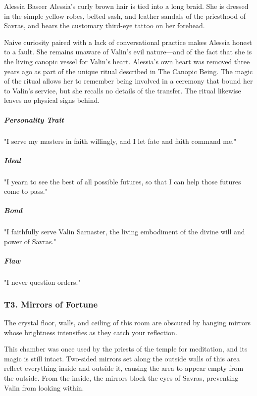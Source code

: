 \documentclass[10pt,a4paper,twoside,bg=print,twocolumn,openany,nodeprecatedcode]{dndbook}
\begin{document}
\begin{DndSidebar}[float=!b]{Alessia Baseer}
Alessia's curly brown hair is tied into a long braid. She is dressed in the simple yellow robes, belted sash, and leather sandals of the priesthood of Savras, and bears the customary third-eye tattoo on her forehead.



Naive curiosity paired with a lack of conversational practice makes Alessia honest to a fault. She remains unaware of Valin's evil nature—and of the fact that she is the living canopic vessel for Valin's heart. Alessia's own heart was removed three years ago as part of the unique ritual described in The Canopic Being. The magic of the ritual allows her to remember being involved in a ceremony that bound her to Valin's service, but she recalls no details of the transfer. The ritual likewise leaves no physical signs behind.



\subparagraph{Personality Trait}
"I serve my masters in faith willingly, and I let fate and faith command me."



\subparagraph{Ideal}
"I yearn to see the best of all possible futures, so that I can help those futures come to pass."



\subparagraph{Bond}
"I faithfully serve Valin Sarnaster, the living embodiment of the divine will and power of Savras."



\subparagraph{Flaw}
"I never question orders."



\end{DndSidebar}

\subsubsection{T3. Mirrors of Fortune}
\begin{DndReadAloud}{}
The crystal floor, walls, and ceiling of this room are obscured by hanging mirrors whose brightness intensifies as they catch your reflection.

\end{DndReadAloud}

This chamber was once used by the priests of the temple for meditation, and its magic is still intact. Two-sided mirrors set along the outside walls of this area reflect everything inside and outside it, causing the area to appear empty from the outside. From the inside, the mirrors block the eyes of Savras, preventing Valin from looking within.
\end{document}

